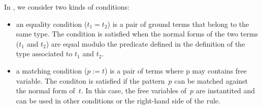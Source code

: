 In \TOM, we consider two kinds of conditions:
\begin{itemize}
\item an equality condition ($t_1 = t_2$) is a pair of ground terms that
  belong to the same type.
  The condition is satisfied when the normal forms of the two terms
  ($t_1$ and $t_2$) are equal modulo the  predicate defined in
  the definition of the type associated to $t_1$ and $t_2$.
\item a matching condition ($p := t$) is a pair of terms where p may
  contains free variable. The conditon is satisfied if the pattern~$p$
  can be matched against the normal form of~$t$. In this case, the
  free variables of~$p$ are instantited and can be used in other
  conditions or the right-hand side of the rule.
\end{itemize}

